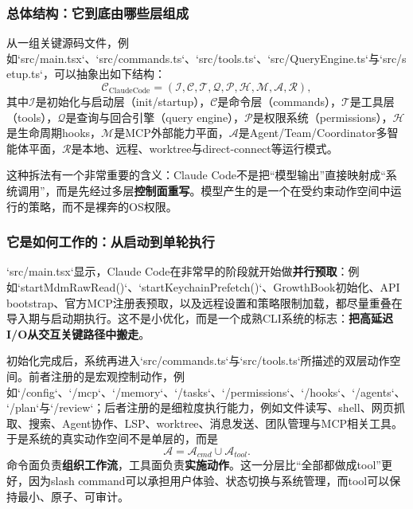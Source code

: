 \documentclass[12pt,a4paper]{article}
\begin{document}
\subsubsection{总体结构：它到底由哪些层组成}

从一组关键源码文件，例如`src/main.tsx`、`src/commands.ts`、`src/tools.ts`、`src/QueryEngine.ts`与`src/setup.ts`，可以抽象出如下结构：
\begin{equation}
\mathcal{C}_{\text{ClaudeCode}}
=
(\mathcal{I}, \mathcal{C}, \mathcal{T}, \mathcal{Q}, \mathcal{P}, \mathcal{H}, \mathcal{M}, \mathcal{A}, \mathcal{R}),
\end{equation}
其中$\mathcal{I}$是初始化与启动层（init/startup），$\mathcal{C}$是命令层（commands），$\mathcal{T}$是工具层（tools），$\mathcal{Q}$是查询与回合引擎（query engine），$\mathcal{P}$是权限系统（permissions），$\mathcal{H}$是生命周期hooks，$\mathcal{M}$是MCP外部能力平面，$\mathcal{A}$是Agent/Team/Coordinator多智能体平面，$\mathcal{R}$是本地、远程、worktree与direct-connect等运行模式。

这种拆法有一个非常重要的含义：Claude Code不是把“模型输出”直接映射成“系统调用”，而是先经过多层\textbf{控制面重写}。模型产生的是一个在受约束动作空间中运行的策略，而不是裸奔的OS权限。

\subsubsection{它是如何工作的：从启动到单轮执行}

`src/main.tsx`显示，Claude Code在非常早的阶段就开始做\textbf{并行预取}：例如`startMdmRawRead()`、`startKeychainPrefetch()`、GrowthBook初始化、API bootstrap、官方MCP注册表预取，以及远程设置和策略限制加载，都尽量重叠在导入期与启动期执行。这不是小优化，而是一个成熟CLI系统的标志：\textbf{把高延迟I/O从交互关键路径中搬走}。

初始化完成后，系统再进入`src/commands.ts`与`src/tools.ts`所描述的双层动作空间。前者注册的是宏观控制动作，例如`/config`、`/mcp`、`/memory`、`/tasks`、`/permissions`、`/hooks`、`/agents`、`/plan`与`/review`；后者注册的是细粒度执行能力，例如文件读写、shell、网页抓取、搜索、Agent协作、LSP、worktree、消息发送、团队管理与MCP相关工具。于是系统的真实动作空间不是单层的，而是
\begin{equation}
\mathcal{A} = \mathcal{A}_{cmd} \cup \mathcal{A}_{tool}.
\end{equation}
命令面负责\textbf{组织工作流}，工具面负责\textbf{实施动作}。这一分层比“全部都做成tool”更好，因为slash command可以承担用户体验、状态切换与系统管理，而tool可以保持最小、原子、可审计。
\end{document}
